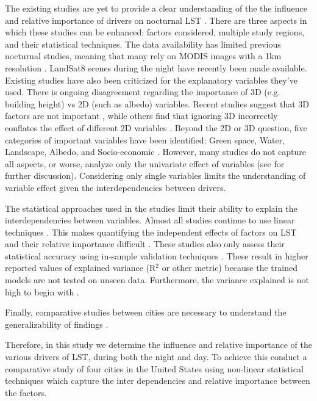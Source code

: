 \documentclass[final,3p,times,twocolumn,sort&compress]{elsarticle}
\begin{document}
The existing studies are yet to provide a clear understanding of the the influence and relative importance of drivers on nocturnal LST \cite{Chun2017-mm, Echevarria_Icaza2016-fr, Wicki2017-fv, Zhou2014-wc }. 
There are three aspects in which these studies can be enhanced: factors considered, multiple study regions, and their statistical techniques.
The data availability has limited previous nocturnal studies, meaning that many rely on MODIS images with a 1km resolution \cite{}.
LandSat8 scenes during the night have recently been made available. 
Existing studies have also been criticized for the explanatory variables they've used.
There is ongoing disagreement regarding the importance of 3D (e.g. building height) vs 2D (such as albedo) variables.  
Recent studies suggest that 3D factors are not important \cite{Berger2017-lx}, while others find that ignoring 3D incorrectly conflates the effect of different 2D variables \cite{Chun2017-mm}.
Beyond the 2D or 3D question, five categories of important variables have been identified: Green space, Water, Landscape, Albedo, and Socio-economic \cite{Peng2018-cp}. However, many studies do not capture all aspects, or worse, analyze only the univariate effect of variables \cite{Zhao2017-cc, Merbitz2012-xz, Unger2004-ry} (see \cite{Peng2018-cp, Chun2017-mm} for further discussion). Considering only single variables limits the understanding of variable effect given the interdependencies between drivers.

The statistical approaches used in the studies limit their ability to explain the interdependencies between variables. 
Almost all studies continue to use linear techniques \cite{Li2017-yl, etc.}. 
This makes quantifying the independent effects of factors on LST and their relative importance difficult \cite{Peng2018-cp, Zhou2014-wc}.
These studies also only assess their statistical accuracy using in-sample validation techniques \cite{something about validation e.g. Schmuli}.
These result in higher reported values of explained variance (R$^2$ or other metric) because the trained models are not tested on unseen data.
Furthermore, the variance explained is not high to begin with \cite{Chun2017-mm}.

Finally, comparative studies between cities are necessary to understand the generalizability of findings \cite{Peng2012-iy, Hung2006-qy}.

Therefore, in this study we determine the influence and relative importance of the various drivers of LST, during both the night and day. 
To achieve this conduct a comparative study of four cities in the United States using non-linear statistical techniques which capture the inter dependencies and relative importance between the factors.
\end{document}
